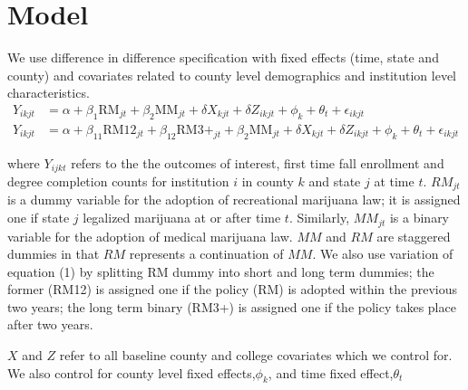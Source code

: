 \documentclass[12pt]{article}%
\begin{document}
\section{Model}

We use difference in difference specification with fixed effects  (time, state and county) and covariates related to county level demographics and institution level characteristics.
\begin{align}
Y_{ikjt} &= \alpha + \beta_1 \text{RM}_{jt} + \beta_2 \text{MM}_{jt}  + \delta X_{kjt}  + \delta Z_{ikjt} + \phi_{k}+ \theta_t +\epsilon_{ikjt}\\
Y_{ikjt} &= \alpha + \beta_{11} \text{RM12}_{jt} + \beta_{12} \text{RM3+}_{jt} + \beta_2 \text{MM}_{jt}  + \delta X_{kjt}  + \delta Z_{ikjt} + \phi_{k}+ \theta_t +\epsilon_{ikjt}
\end{align}



where $Y_{ijkt}$ refers to the the outcomes of interest, first time fall enrollment and degree completion counts for institution $i$ in  county $k$ and state $j$ at time $t$. $RM_{jt}$ is a dummy variable for the adoption of recreational marijuana law; it is assigned one if state $j$ legalized marijuana at or after time $t$. Similarly, $MM_{jt}$ is a binary variable for the adoption of medical marijuana law. $MM$ and $RM$ are staggered dummies in that $RM$ represents a continuation of $MM$. 
We also use variation of equation (1) by splitting RM dummy into short and long term dummies; the former (RM12) is assigned one if the policy (RM) is adopted within the previous two years; the long term binary (RM3+) is assigned one if the policy takes place after two years. 

$X$ and $Z$ refer to all baseline county and college covariates which we control for. We also control for county level fixed effects,$\phi_{k}$, and time fixed effect,$\theta_t$ 

\end{document}
